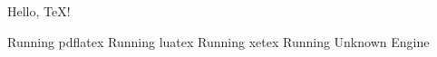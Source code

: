 \documentclass[english,parskip=half,12pt,a4paper]{scrartcl}
\begin{document}
Hello, \TeX!

\ifPDFTeX
  Running pdflatex
\else\ifLuaTeX
  Running luatex
\else\ifXeTeX
  Running xetex
\else
  Running Unknown Engine
\fi\fi\fi
\end{document}

